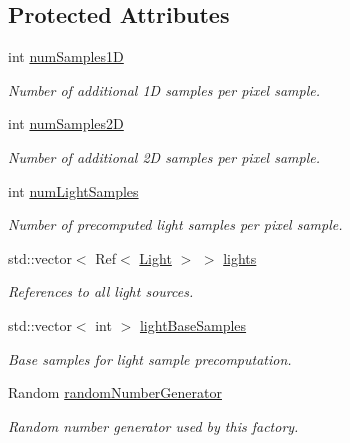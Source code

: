 \subsection*{Protected Attributes}
\begin{DoxyCompactItemize}
\item 
int \hyperlink{classembree_1_1_sampler_factory_aadbd34d68f975f6821f189e73e78833a}{numSamples1D}
\begin{DoxyCompactList}\small\item\em Number of additional 1D samples per pixel sample. \item\end{DoxyCompactList}\item 
int \hyperlink{classembree_1_1_sampler_factory_a2c6bbf4c15325b26b149dff750845759}{numSamples2D}
\begin{DoxyCompactList}\small\item\em Number of additional 2D samples per pixel sample. \item\end{DoxyCompactList}\item 
int \hyperlink{classembree_1_1_sampler_factory_adec6d83718e9bfc86f8fc7fc7b366dff}{numLightSamples}
\begin{DoxyCompactList}\small\item\em Number of precomputed light samples per pixel sample. \item\end{DoxyCompactList}\item 
std::vector$<$ Ref$<$ \hyperlink{classembree_1_1_light}{Light} $>$ $>$ \hyperlink{classembree_1_1_sampler_factory_aa965aa3f8efa69f3d6f43abc1b205045}{lights}
\begin{DoxyCompactList}\small\item\em References to all light sources. \item\end{DoxyCompactList}\item 
std::vector$<$ int $>$ \hyperlink{classembree_1_1_sampler_factory_a188a3e7b13c69d88c0d6a9e0192d84f4}{lightBaseSamples}
\begin{DoxyCompactList}\small\item\em Base samples for light sample precomputation. \item\end{DoxyCompactList}\item 
Random \hyperlink{classembree_1_1_sampler_factory_ade987097a728763b39b5234f7f45799b}{randomNumberGenerator}
\begin{DoxyCompactList}\small\item\em Random number generator used by this factory. \item\end{DoxyCompactList}\item 

\end{DoxyCompactItemize}
